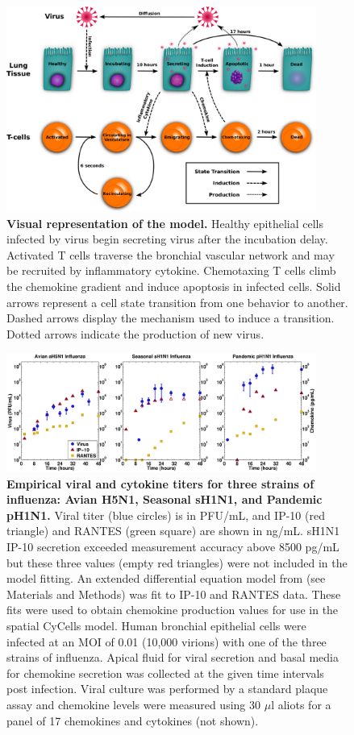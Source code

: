 \documentclass[10pt]{article}
\begin{document}
\begin{figure}[!ht]
\begin{center}
\includegraphics[width=4in]{Figure_2}
\end{center}
\caption{{\bf Visual representation of the model.}  Healthy epithelial cells infected by virus begin secreting virus after the incubation delay.  Activated T cells traverse the bronchial vascular network and may be recruited by inflammatory cytokine.  Chemotaxing T cells climb the chemokine gradient and induce apoptosis in infected cells.  Solid arrows represent a cell state transition from one behavior to another.  Dashed arrows display the mechanism used to induce a transition.  Dotted arrows indicate the production of new virus.}
\label{fig:modelchart}
\end{figure}

\begin{figure}[!ht]
\begin{center}
 \includegraphics[width=4in]{Figure_3}
 \end{center}
\caption{{\bf Empirical viral and cytokine titers for three strains of influenza: Avian H5N1, Seasonal sH1N1, and Pandemic pH1N1.}  Viral titer (blue circles) is in PFU/mL, and IP-10 (red triangle) and RANTES (green square) are shown in ng/mL.   sH1N1 IP-10 secretion exceeded measurement accuracy above 8500 pg/mL but these three values (empty red triangles) were not included in the model fitting.  An extended differential equation model from \cite{Mitchell2011} (see Materials and Methods) was fit to IP-10 and RANTES data.  These fits were used to obtain chemokine production values for use in the spatial CyCells model.  Human bronchial epithelial cells were infected at an MOI of 0.01 (10,000 virions) with one of the three strains of influenza.  Apical fluid for viral secretion and basal media for chemokine secretion was collected at the given time intervals post infection.  Viral culture was performed by a standard plaque assay and chemokine levels were measured using 30 $\mu$l aliots for a panel of 17 chemokines and cytokines (not shown).} 
 \label{fig:data}
\end{figure}
\end{document}

